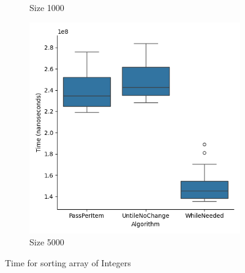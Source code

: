 \documentclass{article}
\begin{document}
\begin{figure}[ht]
\begin{subfigure}{0.3\textwidth}
    \caption{Size 1000}
    \label{fig:img2}
  \end{subfigure}
  \begin{subfigure}{0.3\textwidth}
    \centering
    \includegraphics[width=\linewidth]{../figureInt5000.png}
    \caption{Size 5000}
    \label{fig:img3}
  \end{subfigure}
  \caption{Time for sorting array of Integers}
  \label{fig:three_images}
\end{figure}
\end{document}
